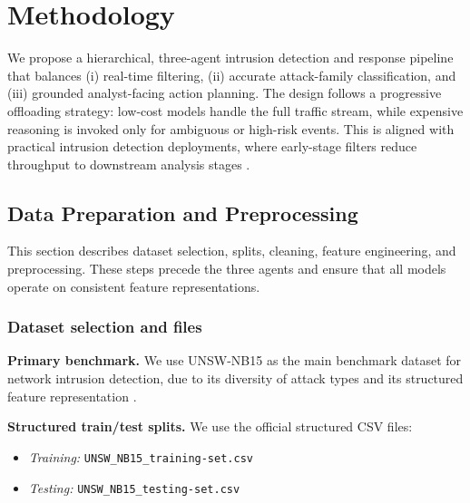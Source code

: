 
\section{Methodology}
\label{sec:methodology}

We propose a hierarchical, three-agent intrusion detection and response pipeline that balances (i) real-time filtering, (ii) accurate attack-family classification, and (iii) grounded analyst-facing action planning. The design follows a progressive offloading strategy: low-cost models handle the full traffic stream, while expensive reasoning is invoked only for ambiguous or high-risk events. This is aligned with practical intrusion detection deployments, where early-stage filters reduce throughput to downstream analysis stages \cite{Mirsky2018Kitsune}.

\subsection{Data Preparation and Preprocessing}
\label{sec:data_preparation}

This section describes dataset selection, splits, cleaning, feature engineering, and preprocessing. These steps precede the three agents and ensure that all models operate on consistent feature representations.

\subsubsection{Dataset selection and files}
\textbf{Primary benchmark.} We use UNSW-NB15 as the main benchmark dataset for network intrusion detection, due to its diversity of attack types and its structured feature representation \cite{Moustafa2015UNSW,Moustafa2015UNSW2}.

\textbf{Structured train/test splits.} We use the official structured CSV files:
\begin{itemize}
  \item \emph{Training:} \texttt{UNSW\_NB15\_training-set.csv}
  \item \emph{Testing:} \texttt{UNSW\_NB15\_testing-set.csv}
\end{itemize}

